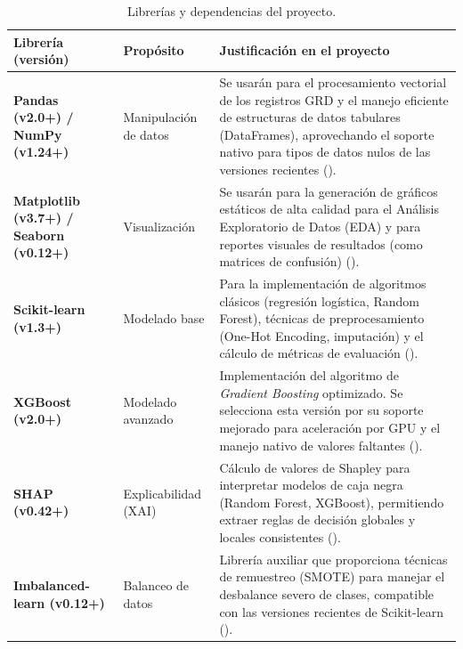 \begin{table}[htbp]
\centering
\footnotesize
\setlength{\tabcolsep}{4pt}
\renewcommand{\arraystretch}{1.15}
\caption{Librerías y dependencias del proyecto.}
\label{tab:librerias}
\begin{tabular}{|l|l|l|}
\hline
\parbox[t]{4.0cm}{\textbf{Librería (versión)}} & \parbox[t]{3.0cm}{\textbf{Propósito}} & \parbox[t]{8.0cm}{\textbf{Justificación en el proyecto}} \\ \hline
\parbox[t]{4.0cm}{\textbf{Pandas (v2.0+) / NumPy (v1.24+)}} & \parbox[t]{3.0cm}{Manipulación de datos} & \parbox[t]{8.0cm}{Se usarán para el procesamiento vectorial de los registros GRD y el manejo eficiente de estructuras de datos tabulares (DataFrames), aprovechando el soporte nativo para tipos de datos nulos de las versiones recientes (\cite{mckinney2010pandas}).} \\ \hline
\parbox[t]{4.0cm}{\textbf{Matplotlib (v3.7+) / Seaborn (v0.12+)}} & \parbox[t]{3.0cm}{Visualización} & \parbox[t]{8.0cm}{Se usarán para la generación de gráficos estáticos de alta calidad para el Análisis Exploratorio de Datos (EDA) y para reportes visuales de resultados (como matrices de confusión) (\cite{hunter2007matplotlib}).} \\ \hline
\parbox[t]{4.0cm}{\textbf{Scikit-learn (v1.3+)}} & \parbox[t]{3.0cm}{Modelado base} & \parbox[t]{8.0cm}{Para la implementación de algoritmos clásicos (regresión logística, Random Forest), técnicas de preprocesamiento (One-Hot Encoding, imputación) y el cálculo de métricas de evaluación (\cite{pedregosa2011scikit}).} \\ \hline
\parbox[t]{4.0cm}{\textbf{XGBoost (v2.0+)}} & \parbox[t]{3.0cm}{Modelado avanzado} & \parbox[t]{8.0cm}{Implementación del algoritmo de \textit{Gradient Boosting} optimizado. Se selecciona esta versión por su soporte mejorado para aceleración por GPU y el manejo nativo de valores faltantes (\cite{chen2016xgboost}).} \\ \hline
\parbox[t]{4.0cm}{\textbf{SHAP (v0.42+)}} & \parbox[t]{3.0cm}{Explicabilidad (XAI)} & \parbox[t]{8.0cm}{Cálculo de valores de Shapley para interpretar modelos de caja negra (Random Forest, XGBoost), permitiendo extraer reglas de decisión globales y locales consistentes (\cite{lundberg2017shap}).} \\ \hline
\parbox[t]{4.0cm}{\textbf{Imbalanced-learn (v0.12+)}} & \parbox[t]{3.0cm}{Balanceo de datos} & \parbox[t]{8.0cm}{Librería auxiliar que proporciona técnicas de remuestreo (SMOTE) para manejar el desbalance severo de clases, compatible con las versiones recientes de Scikit-learn (\cite{lemaitre2017imbalanced}).} \\ \hline
\end{tabular}
\end{table}


